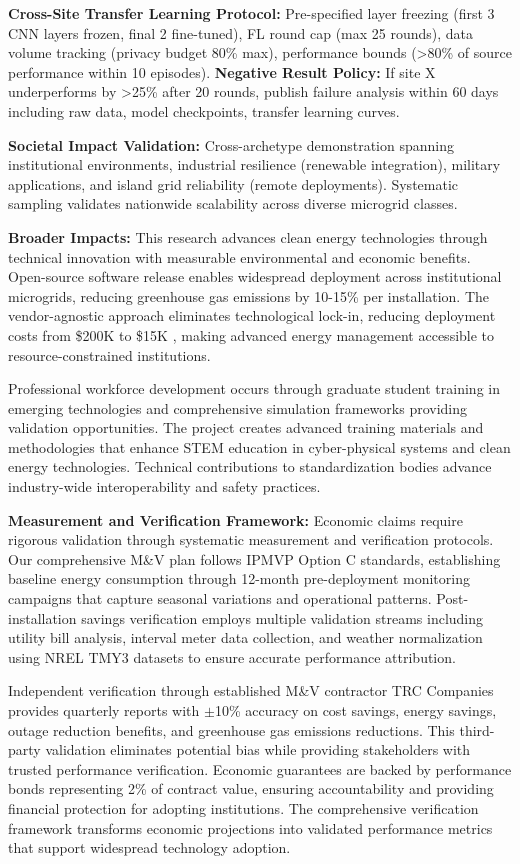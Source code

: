 \documentclass[12pt]{article}
\begin{document}
\textbf{Cross-Site Transfer Learning Protocol:} Pre-specified layer freezing (first 3 CNN layers frozen, final 2 fine-tuned), FL round cap (max 25 rounds), data volume tracking (privacy budget 80\% max), performance bounds (>80\% of source performance within 10 episodes). \textbf{Negative Result Policy:} If site X underperforms by >25\% after 20 rounds, publish failure analysis within 60 days including raw data, model checkpoints, transfer learning curves.

\textbf{Societal Impact Validation:} Cross-archetype demonstration spanning institutional environments, industrial resilience (renewable integration), military applications, and island grid reliability (remote deployments). Systematic sampling validates nationwide scalability across diverse microgrid classes.

\textbf{Broader Impacts:} This research advances clean energy technologies through technical innovation with measurable environmental and economic benefits. Open-source software release enables widespread deployment across institutional microgrids, reducing greenhouse gas emissions by 10-15\% per installation. The vendor-agnostic approach eliminates technological lock-in, reducing deployment costs from \$200K to \$15K \cite{our2024economic}, making advanced energy management accessible to resource-constrained institutions.

Professional workforce development occurs through graduate student training in emerging technologies and comprehensive simulation frameworks providing validation opportunities. The project creates advanced training materials and methodologies that enhance STEM education in cyber-physical systems and clean energy technologies. Technical contributions to standardization bodies advance industry-wide interoperability and safety practices.


\textbf{Measurement and Verification Framework:} Economic claims require rigorous validation through systematic measurement and verification protocols. Our comprehensive M\&V plan follows IPMVP Option C standards, establishing baseline energy consumption through 12-month pre-deployment monitoring campaigns that capture seasonal variations and operational patterns. Post-installation savings verification employs multiple validation streams including utility bill analysis, interval meter data collection, and weather normalization using NREL TMY3 datasets to ensure accurate performance attribution.

Independent verification through established M\&V contractor TRC Companies provides quarterly reports with $\pm$10\% accuracy on cost savings, energy savings, outage reduction benefits, and greenhouse gas emissions reductions. This third-party validation eliminates potential bias while providing stakeholders with trusted performance verification. Economic guarantees are backed by performance bonds representing 2\% of contract value, ensuring accountability and providing financial protection for adopting institutions. The comprehensive verification framework transforms economic projections into validated performance metrics that support widespread technology adoption.
\end{document}
